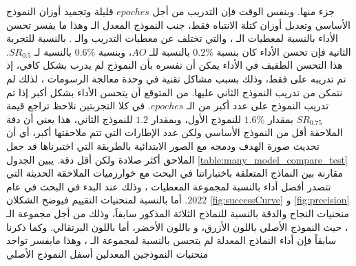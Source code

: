 جزء منها.
وبنفس الوقت فإن التدريب من أجل 
$epoches$
قليلة وتجميد أوزان النموذج الأساسي وتعديل أوزان كتلة الانتباه فقط، جنب النموذج المعدل الـ
وهذا ما يفسر تحسن الأداء بالنسبة لمعطيات الـ
،
والتي تختلف عن معطيات التدريب والـ
.
\newline
بالنسبة للتجربة الثانية
 فإن تحسن الأداء كان بنسبة 
$0.2\%$
بالنسبة للـ
$AO$،
وبنسبة 
$0.6\%$
بالنسبة لـ
$SR_{0.5}$.
هذا التحسن الطفيف في الأداء يمكن أن نفسره بأن النموذج لم يدرب بشكل كافي، إذ تم تدريبه على 
فقط،
وذلك بسبب مشاكل تقنية في وحدة معالجة الرسومات 
،
لذلك لم نتمكن من تدريب النموذج الثاني عليها.
\newline
من المتوقع أن يتحسن الأداء بشكل أكبر إذا تم تدريب النموذج على عدد أكبر من الـ
$epoches$.
\newline
في كلا التجربتين نلاحظ تراجع قيمة 
$SR_{0.75}$
بمقدار 
$1.6\%$
للنموذج الأول، وبمقدار 
$1.2$
للنموذج الثاني، هذا يعني أن دقة الملاحقة أقل من النموذج الأساسي ولكن عدد الإطارات التي تتم ملاحقتها أكبر، أي أن تحديث صورة الهدف ودمجه مع الصور الابتدائية بالطريقة التي اختبرناها قد جعل الملاحق أكثر صلادة ولكن أقل دقة.
\newline
يبين الجدول 
\ref{table:many_model_compare_test}
مقارنة بين النماذج المتعلقة باختباراتنا في البحث  مع خوارزميات الملاحقة الحديثة التي تتصدر أفضل أداء بالنسبة لمجموعة المعطيات 
،
وذلك عند البدء في البحث في عام
$2022$.
\newline
أما بالنسبة لمنحنيات التقييم فيوضح الشكلان
\ref{fig:successCurve}
و
\ref{fig:precision}
منحنيات النجاح والدقة بالنسبة للنماذج الثلاثة المذكور سابقاَ، وذلك من أجل مجموعة الـ
،
حيث النموذج الأصلي 
باللون الأزرق، و
باللون الأخضر، أما
باللون البرتقالي.
وكما ذكرنا سابقاً فإن أداء النماذج المعدلة لم يتحسن بالنسبة لمجموعة الـ
،
وهذا مايفسر تواجد منحنيات النموذجين المعدلين
أسفل النموذج الأصلي
